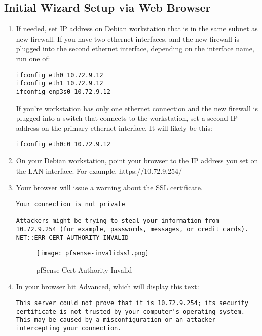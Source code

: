\subsection{Initial Wizard Setup via Web Browser}

\begin{enumerate}
 \item If needed, set IP address on Debian workstation that is in the same subnet as new firewall. If you have two ethernet interfaces, and the new firewall is plugged into the second ethernet interface, depending on the interface name, run one of:
\begin{verbatim}
ifconfig eth0 10.72.9.12
ifconfig eth1 10.72.9.12
ifconfig enp3s0 10.72.9.12
\end{verbatim}

If you're workstation has only one ethernet connection and the new firewall is plugged into a switch that connects to the workstation, set a second IP address on the primary ethernet interface. It will likely be this:
\begin{verbatim}
ifconfig eth0:0 10.72.9.12
\end{verbatim}

 \item On your Debian workstation, point your browser to the IP address you set on the LAN interface. For example, https://10.72.9.254/
 \item Your browser will issue a warning about the SSL certificate.

\begin{verbatim}
Your connection is not private

Attackers might be trying to steal your information from 10.72.9.254 (for example, passwords, messages, or credit cards). NET::ERR_CERT_AUTHORITY_INVALID
\end{verbatim}

\begin{figure}[h!]
\texttt{[image: pfsense-invalidssl.png]}
 \caption{pfSense Cert Authority Invalid}
 \label{fig:pfsense-invalidssl}
\end{figure}

 \item In your browser hit Advanced, which will display this text:
\begin{verbatim}
This server could not prove that it is 10.72.9.254; its security certificate is not trusted by your computer's operating system. This may be caused by a misconfiguration or an attacker intercepting your connection.


\end{verbatim}
\end{enumerate}
